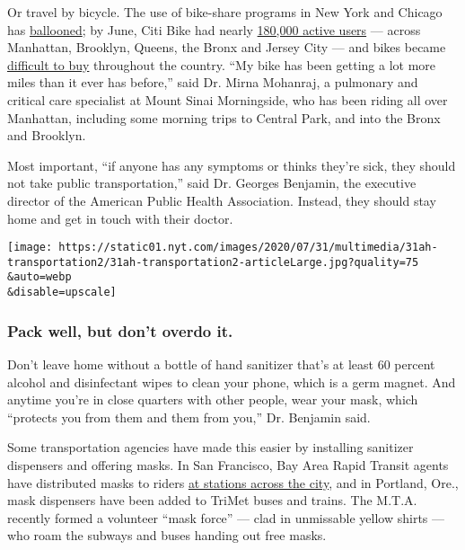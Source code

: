 Or travel by bicycle. The use of bike-share programs in New York and
Chicago has
\href{https://www.nytimes.com/2020/03/14/nyregion/coronavirus-nyc-bike-commute.html}{ballooned};
by June, Citi Bike had nearly
\href{https://d21xlh2maitm24.cloudfront.net/nyc/June-2020-Citi-Bike-Monthly-Report.pdf?mtime=20200722104600}{180,000
active users} --- across Manhattan, Brooklyn, Queens, the Bronx and
Jersey City --- and bikes became
\href{https://www.nytimes.com/2020/05/18/nyregion/bike-shortage-coronavirus.html}{difficult
to buy} throughout the country. ``My bike has been getting a lot more
miles than it ever has before,'' said Dr. Mirna Mohanraj, a pulmonary
and critical care specialist at Mount Sinai Morningside, who has been
riding all over Manhattan, including some morning trips to Central Park,
and into the Bronx and Brooklyn.

Most important, ``if anyone has any symptoms or thinks they're sick,
they should not take public transportation,'' said Dr. Georges Benjamin,
the executive director of the American Public Health Association.
Instead, they should stay home and get in touch with their doctor.

\texttt{[image: https://static01.nyt.com/images/2020/07/31/multimedia/31ah-transportation2/31ah-transportation2-articleLarge.jpg?quality=75\\\&auto=webp\\\&disable=upscale]}

\hypertarget{pack-well-but-dont-overdo-it}{%
\subsubsection{Pack well, but don't overdo
it.}\label{pack-well-but-dont-overdo-it}}

Don't leave home without a bottle of hand sanitizer that's at least 60
percent alcohol and disinfectant wipes to clean your phone, which is a
germ magnet. And anytime you're in close quarters with other people,
wear your mask, which ``protects you from them and them from you,'' Dr.
Benjamin said.

Some transportation agencies have made this easier by installing
sanitizer dispensers and offering masks. In San Francisco, Bay Area
Rapid Transit agents have distributed masks to riders
\href{https://twitter.com/SFBART/status/1280632009560174592}{at stations
across the city}, and in Portland, Ore., mask dispensers have been added
to TriMet buses and trains. The M.T.A. recently formed a volunteer
``mask force'' --- clad in unmissable yellow shirts --- who roam the
subways and buses handing out free masks.

